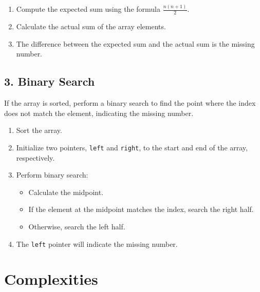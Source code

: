 \begin{enumerate}
    \item Compute the expected sum using the formula \(\frac{n(n+1)}{2}\).
    \item Calculate the actual sum of the array elements.
    \item The difference between the expected sum and the actual sum is the missing number.
\end{enumerate}

\subsection*{3. Binary Search}
If the array is sorted, perform a binary search to find the point where the index does not match the element, indicating the missing number.

\begin{enumerate}
    \item Sort the array.
    \item Initialize two pointers, \texttt{left} and \texttt{right}, to the start and end of the array, respectively.
    \item Perform binary search:
    \begin{itemize}
        \item Calculate the midpoint.
        \item If the element at the midpoint matches the index, search the right half.
        \item Otherwise, search the left half.
    \end{itemize}
    \item The \texttt{left} pointer will indicate the missing number.
\end{enumerate}


\section*{Complexities}

